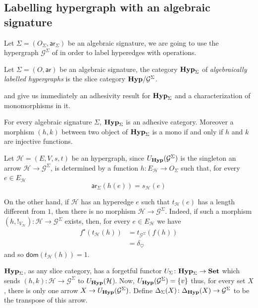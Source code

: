 \documentclass[runningheads,envcountsect]{llncs}
\newcommand{\catname}[1]{\textbf{\textup{#1}}}
\newcommand{\hyp}{\catname{Hyp}}
\newcommand{\hyps}{\catname{Hyp}_{\Sigma}}
\newcommand{\dom}{\mathsf{dom}}
\newcommand{\ari}{\mathsf{ar}}
\begin{document}
\subsection{Labelling hypergraph with an algebraic signature}
Let $\Sigma=(O_\Sigma, \ari_\Sigma)$ be an algebraic signature, we are going to use the hypergraph $\mathcal{G}^{\Sigma}$ of  in order to label hyperedges with operations.
\begin{definition}Let $\Sigma=(O, \ari)$ be an algebraic signature, the category $\hyps$ of \emph{algebraically labelled hypergraphs} is the slice category $\hyp/\mathcal{G}^\Sigma$.
\end{definition}
 and  give us immediately an adhesivity result for $\hyp_{\Sigma}$ and a characterization of monomorphisms in it.
\begin{proposition}\label{prop:mono}
	For every algebraic signature $\Sigma$, $\hyps$ is an adhesive category. Moreover a morphism $(h,k)$ between two object of $\hyp_{\Sigma}$ is a mono if and only if $h$ and $k$ are injective functions.
\end{proposition}


\begin{remark}\label{rem:label}	
	Let $\mathcal{H}=(E, V, s, t)$ be an hypergraph, since  $U_{\hyp}(\mathcal{G}^{\Sigma})$ is the singleton an arrow $\mathcal{H}\rightarrow \mathcal{G}^{\Sigma}$, is determined by a function $h\colon E_\mathcal{H}\to O_\Sigma$  such that, for every $e\in E_{\mathcal{H}}$
	\[\ari_\Sigma(h(e))=s_\mathcal{H}(e)\]
	
	On the other hand, if $\mathcal{H}$ has an hyperedge $e$ such that $t_{\mathcal{H}}(e)$ has a length different from $1$, then there is no morphism $\mathcal{H}\to \mathcal{G}^{\Sigma}$. Indeed, if such a morphism $(h,!_{V_\mathcal{H}})\colon \mathcal{H}\to \mathcal{G}^\Sigma$ exists, then, for every $e\in E_{\mathcal{H}}$ we have
	\begin{align*}
		f^{\star}(t_{\mathcal{H}}(h))&=t_{\mathcal{G}^{\Sigma}}(f(h))\\&=\delta_\heartsuit
	\end{align*}
	and so $\dom(t_{\mathcal{H}}(h))=1$.  
\end{remark}

$\hyp_{\Sigma}$, as any slice category, has a forgetful functor $U_{\Sigma}\colon \hyp_{\Sigma}\to \catname{Set}$ which sends $(h,k)\colon \mathcal{H}\to \mathcal{G}^{\Sigma}$ to $U_{\hyp}(\mathcal{H}$). Now, $U_{\hyp}(\mathcal{G}^{\Sigma})=\{v\}$ thus, for every set $X$, there is only one arrow $X\to U_{\hyp}(\mathcal{G}^{\Sigma})$. Define $\Delta_{\Sigma}(X)\colon \Delta_{\hyp}(X)\to \mathcal{G}^{\Sigma}$ to be the transpose of this arrow.
\end{document}
